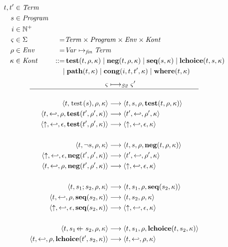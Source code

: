 \documentclass{article}
\begin{document}
{\begin{alignat*}{2}
  t, t' &\in \mathit{Term} && \\
  s &\in \mathit{Program} && \\
  i &\in \mathbb{N}^+ && \\
  \varsigma &\in \Sigma &=& \mathit{Term} \times \mathit{Program} \times \mathit{Env} \times \mathit{Kont} \\
  \rho &\in \mathit{Env} &=& \mathit{Var} \mapsto_{\mathit{fin}} \mathit{Term} \\
  \kappa &\in \mathit{Kont} &::=&\, \mathbf{test}(t,\rho,\kappa) \; | \; \mathbf{neg}(t,\rho,\kappa) \; | \; \mathbf{seq}(s,\kappa) \; | \; \mathbf{lchoice}(t,s,\kappa) \\
  &&|&\; \mathbf{path}(t,\kappa) \; | \; \mathbf{cong}(i,t,t',\kappa) \; | \; \mathbf{where}(t,\kappa)
\end{alignat*}
%
\begin{align*}
  \varsigma & \longmapsto_{\mathit{S2}} \varsigma' \\
  \hline & \\
  \transition{t,\test{s},\rho,\kappa}{t,s,\rho, \cont{test}{t,\rho,\kappa}} \\
  \transition{t,\return,\rho,\cont{test}{t',\rho',\kappa}}{t',\return,\rho',\kappa} \\
  \transition{\fail,\return,\epsilon,\cont{test}{t',\rho',\kappa}}{\fail,\return,\epsilon,\kappa} \\
  \notag \\
  \transition{t,\neg s,\rho,\kappa}{t,s,\rho,\cont{neg}{t,\rho,\kappa}} \\
  \transition{\fail,\return,\epsilon,\cont{neg}{t',\rho',\kappa}}{t',\return,\rho',\kappa} \\
  \transition{t,\return,\rho,\cont{neg}{t',\rho',\kappa}}{\fail,\return,\epsilon,\kappa} \\
  \notag \\
  \transition{t,s_1;s_2,\rho,\kappa}{t,s_1,\rho,\cont{seq}{s_2,\kappa}} \\
  \transition{t,\return,\rho,\cont{seq}{s_2,\kappa}}{t,s_2,\rho,\kappa} \\
  \transition{\fail,\return,\epsilon,\cont{seq}{s_2,\kappa}}{\fail,\return,\epsilon,\kappa} \\
  \notag \\
  \transition{t,s_1 \leftalt s_2,\rho,\kappa}{t,s_1,\rho,\cont{lchoice}{t,s_2,\kappa}} \\
  \transition{t,\return,\rho,\cont{lchoice}{t',s_2,\kappa}}{t,\return,\rho,\kappa} \\

\end{align*}}
\end{document}
